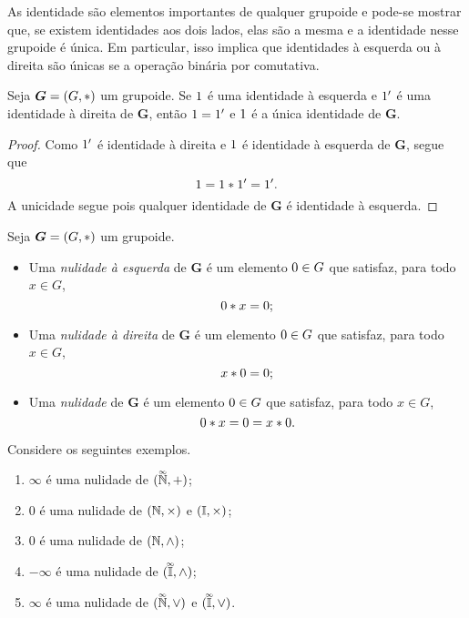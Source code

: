 As identidade são elementos importantes de qualquer grupoide e pode-se mostrar que, se existem identidades aos dois lados, elas são a mesma e a identidade nesse grupoide é única. Em particular, isso implica que identidades à esquerda ou à direita são únicas se a operação binária por comutativa.

\begin{proposition}
\label{prop:unic.elem.neut}
Seja $\bm G = (G,\ast)$ um grupoide. Se $1$ é uma identidade à esquerda e $1'$ é uma identidade à direita de $\bm G$, então $1 = 1'$ e $1$ é a única identidade de $\bm G$.
\end{proposition}
\begin{proof}
Como $1'$ é identidade à direita e $1$ é identidade à esquerda de $\bm G$, segue que
	\begin{equation*}
	1 = 1 \ast 1' = 1'.
	\end{equation*}
A unicidade segue pois qualquer identidade de $\bm G$ é identidade à esquerda.
\end{proof}

\begin{definition}[Nulidade]
Seja $\bm G=(G,\ast)$ um grupoide.
	\begin{itemize}
	\item Uma \emph{nulidade à esquerda} de $\bm G$ é um elemento $0 \in G$ que satisfaz, para todo $x \in G$,
		\begin{equation*}
		0 \ast x = 0;
		\end{equation*}
	\item Uma \emph{nulidade à direita} de $\bm G$ é um elemento $0 \in G$ que satisfaz, para todo $x \in G$,
		\begin{equation*}
		x \ast 0 = 0;
		\end{equation*}
	\item Uma \emph{nulidade} de $\bm G$ é um elemento $0 \in G$ que satisfaz, para todo $x \in G$,
		\begin{equation*}
		0 \ast x = 0 = x \ast 0.
		\end{equation*}
	\end{itemize}
\end{definition}

\begin{example}
Considere os seguintes exemplos.
	\begin{enumerate}
	\item $\infty$ é uma nulidade de $(\accentset{\infty}{\mathbb{N}},+)$;%
	\item $0$ é uma nulidade de $(\mathbb{N},\times)$ e $(\mathbb{I},\times)$;
	\item $0$ é uma nulidade de $(\mathbb{N},\mathbin{\wedge})$;
	\item $-\infty$ é uma nulidade de $(\accentset{\infty}{\mathbb{I}},\mathbin{\wedge})$;
	\item $\infty$ é uma nulidade de $(\accentset{\infty}{\mathbb{N}},\mathbin{\vee})$ e $(\accentset{\infty}{\mathbb{I}},\mathbin{\vee})$.
	\end{enumerate}
\end{example}


